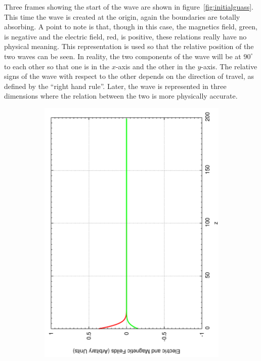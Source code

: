 Three frames showing the start of the wave are shown in figure~\ref{fig:initialguass}. This time the wave is created at the origin, again the boundaries are totally absorbing. A point to note is that, though in this case, the magnetics field, green, is negative and the electric field, red, is positive, these relations really have no physical meaning. This representation is used so that the relative position of the two waves can be seen. In reality, the two components of the wave will be at $90^{\circ}$ to each other so that one is in the $x$-axis and the other in the $y$-axis. The relative signs of the wave with respect to the other depends on the direction of travel, as defined by the ``right hand rule''. Later, the wave is represented in three dimensions where the relation between the two is more physically accurate.
\begin{figure}[ht]
        \centering
        \begin{subfigure}[ht]{0.45\textwidth}
                \centering
                \includegraphics[angle=270, width=\textwidth]{initialguass1.pdf}

\end{subfigure}
\end{figure}
